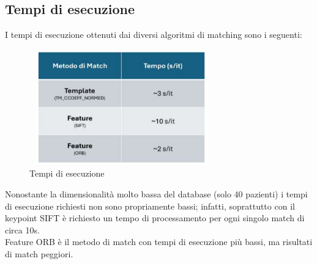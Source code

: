 \documentclass[12pt,a4paper,openright,twoside]{book}
\begin{document}
\subsection{Tempi di esecuzione}
I tempi di esecuzione ottenuti dai diversi algoritmi di matching sono i seguenti:
\begin{figure}[H]
	\centering
	\includegraphics[height=5cm,width=8cm]{figures/tempiprof.pdf}
    	\caption{Tempi di esecuzione}
	\label{fig:tempiprof}
\end{figure}

Nonostante la dimensionalità molto bassa del database (solo 40 pazienti) i tempi di esecuzione richiesti non sono propriamente bassi; infatti, soprattutto con il keypoint SIFT è richiesto un tempo di processamento per ogni singolo match di circa 10s.\\
Feature ORB è il metodo di match con tempi di esecuzione più bassi, ma risultati di match peggiori.


\end{document}
